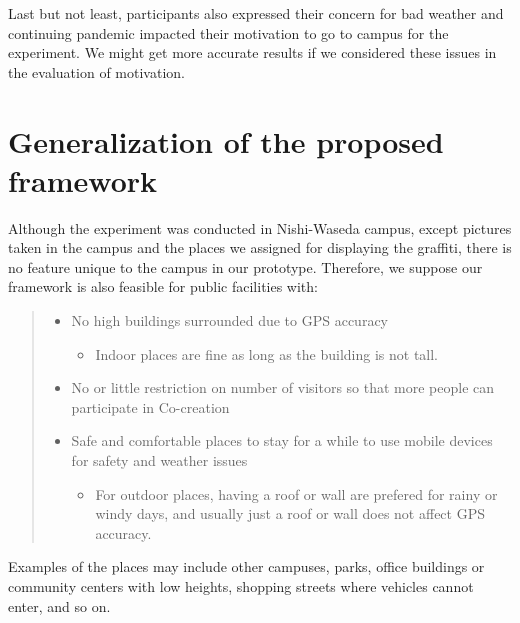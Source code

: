 Last but not least, participants also expressed their concern for bad weather and continuing pandemic impacted their motivation to go to campus for the experiment.
We might get more accurate results if we considered these issues in the evaluation of motivation.

\section{Generalization of the proposed framework}

Although the experiment was conducted in Nishi-Waseda campus, except pictures taken in the campus and the places we assigned for displaying the graffiti,
there is no feature unique to the campus in our prototype.
Therefore, we suppose our framework is also feasible for public facilities with:
\begin{quote}
  \begin{itemize}
    \item No high buildings surrounded due to GPS accuracy
      \begin{itemize}
        \item Indoor places are fine as long as the building is not tall.
      \end{itemize}
    \item No or little restriction on number of visitors so that more people can participate in Co-creation
    \item Safe and comfortable places to stay for a while to use mobile devices for safety and weather issues
      \begin{itemize}
        \item For outdoor places, having a roof or wall are prefered for rainy or windy days, and usually just a roof or wall does not affect GPS accuracy.
      \end{itemize}
  \end{itemize}
\end{quote}

Examples of the places may include other campuses, parks, office buildings or community centers with low heights, shopping streets where vehicles cannot enter, and so on.